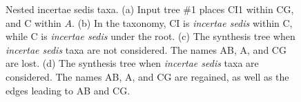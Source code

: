 \documentclass[english]{article}
\begin{document}
\begin{figure}
\hfill{}

\caption{\label{fig:Nested-incertae-sedis}Nested incertae sedis taxa. (a)
Input tree \#1 places CI1 within CG, and C within $A$. (b) In the
taxonomy, CI is \emph{incertae sedis }within C, while C is \emph{incertae
sedis} under the root. (c) The synthesis tree when \emph{incertae
sedis} taxa are not considered. The names AB, A, and CG are lost.
(d) The synthesis tree when \emph{incertae sedis} taxa are considered.
The names AB, A, and CG are regained, as well as the edges leading
to AB and CG.}

\end{figure}
\end{document}
